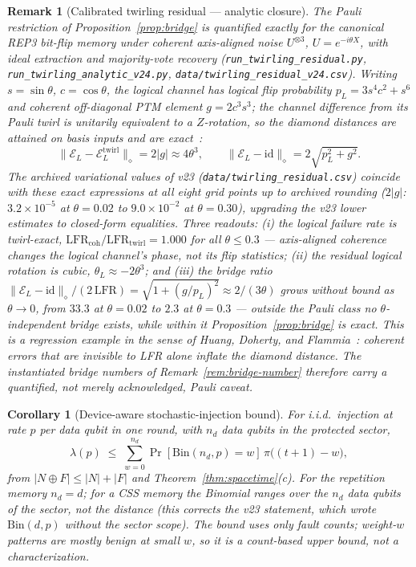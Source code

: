 \documentclass[11pt,a4paper]{article}
\newtheorem{corollary}{Corollary}\newtheorem{proposition}{Proposition}
\newtheorem{remark}{Remark}
\begin{document}
\begin{remark}[Calibrated twirling residual --- analytic closure]
\label{rem:twirl-num}
The Pauli restriction of Proposition~\ref{prop:bridge} is quantified
exactly for the canonical REP3 bit-flip memory under coherent
axis-aligned noise $U^{\otimes3}$, $U=e^{-i\theta X}$, with ideal
extraction and majority-vote recovery
(\texttt{run\_twirling\_\allowbreak residual.py},
\texttt{run\_twirling\_\allowbreak analytic\_v24.py},
\texttt{data/\allowbreak twirling\_\allowbreak residual\_\allowbreak v24.csv}).
Writing $s=\sin\theta$, $c=\cos\theta$, the logical channel has
logical flip probability $p_L=3s^{4}c^{2}+s^{6}$ and coherent
off-diagonal PTM element $g=2c^{3}s^{3}$; the channel difference from
its Pauli twirl is unitarily equivalent to a $Z$-rotation, so the
diamond distances are attained on basis inputs and are
\emph{exact}~\cite{Watrous2018}:
\begin{equation}
\|\mathcal{E}_L-\mathcal{E}_L^{\mathrm{twirl}}\|_{\diamond}=2|g|
\approx4\theta^{3},
\qquad
\|\mathcal{E}_L-\mathrm{id}\|_{\diamond}=2\sqrt{p_L^{2}+g^{2}}.
\end{equation}
The archived variational values of v23
(\texttt{data/twirling\_residual.csv}) coincide with these exact
expressions at all eight grid points up to archived rounding
($2|g|$: $3.2\times10^{-5}$ at $\theta=0.02$ to $9.0\times10^{-2}$ at
$\theta=0.30$), upgrading the v23 lower estimates to closed-form
equalities. Three readouts: (i) the logical failure rate is
twirl-exact, $\mathrm{LFR}_{\mathrm{coh}}/\mathrm{LFR}_{\mathrm{twirl}}
=1.000$ for all $\theta\le0.3$ --- axis-aligned coherence changes the
logical channel's phase, not its flip statistics; (ii) the residual
logical rotation is cubic, $\theta_L\approx-2\theta^{3}$; and (iii) the
bridge ratio
$\|\mathcal{E}_L-\mathrm{id}\|_{\diamond}/(2\,\mathrm{LFR})
=\sqrt{1+(g/p_L)^{2}}\approx 2/(3\theta)$
grows without bound as $\theta\to0$, from $33.3$ at $\theta=0.02$ to
$2.3$ at $\theta=0.3$ --- outside the Pauli class no
$\theta$-independent bridge exists, while within it
Proposition~\ref{prop:bridge} is exact. This is a regression example in
the sense of Huang, Doherty, and Flammia~\cite{huang2019coherent}:
coherent errors that are invisible to LFR alone inflate the diamond
distance. The instantiated bridge numbers of
Remark~\ref{rem:bridge-number} therefore carry a quantified, not merely
acknowledged, Pauli caveat.
\end{remark}

\begin{corollary}[Device-aware stochastic-injection bound]\label{cor:stoch}
For i.i.d.\ injection at rate $p$ per data qubit in one round, with
$n_d$ data qubits in the protected sector,
\[
\lambda(p)\;\le\;\sum_{w=0}^{n_d}\Pr[\mathrm{Bin}(n_d,p)=w]\,
\pi\bigl((t{+}1)-w\bigr),
\]
from $|N\oplus F|\le|N|+|F|$ and Theorem~\ref{thm:spacetime}(c). For the
repetition memory $n_d=d$; for a CSS memory the Binomial ranges over the
$n_d$ data qubits of the sector, not the distance (this corrects the
v23 statement, which wrote $\mathrm{Bin}(d,p)$ without the sector
scope). The bound uses only fault counts; weight-$w$ patterns are
mostly benign at small $w$, so it is a count-based upper bound, not a
characterization.
\end{corollary}
\end{document}
